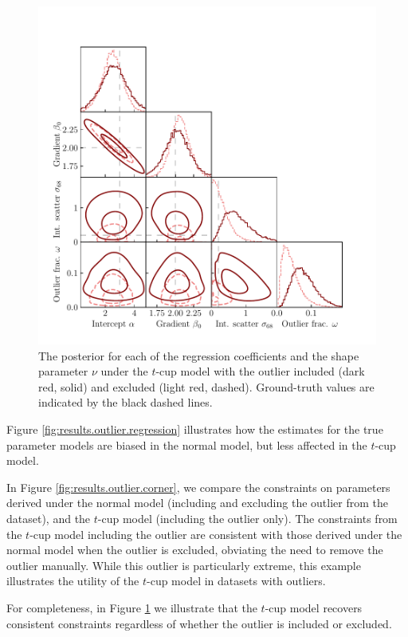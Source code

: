 \documentclass[fleqn,usenatbib]{rasti}
\begin{document}
\begin{figure}
    \includegraphics[width=\columnwidth]{graphics/fixed/corner_outlier_tcup.pdf}
    \caption{The posterior for each of the regression coefficients and the shape
    parameter $\nu$ under the $t$-cup model with the outlier included (dark red,
    solid) and excluded (light red, dashed). Ground-truth values are indicated
    by the black dashed lines.}
    \label{fig:results.outlier.tcup}
\end{figure}

Figure \ref{fig:results.outlier.regression} illustrates how the estimates for
the true parameter models are biased in the normal model, but less affected in
the $t$-cup model.

In Figure \ref{fig:results.outlier.corner}, we compare the constraints on
parameters derived under the normal model (including and excluding the outlier
from the dataset), and the $t$-cup model (including the outlier only). The
constraints from the $t$-cup model including the outlier are consistent with
those derived under the normal model when the outlier is excluded, obviating the
need to remove the outlier manually. While this outlier is particularly extreme,
this example illustrates the utility of the $t$-cup model in datasets with
outliers.

For completeness, in Figure \ref{fig:results.outlier.tcup} we illustrate that
the $t$-cup model recovers consistent constraints regardless of whether the outlier is included or excluded.
\end{document}
